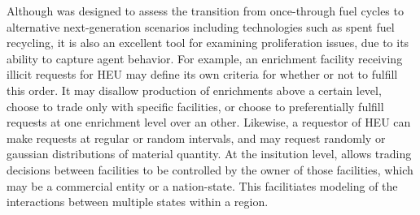 Although \Cyclus was designed to assess the transition from once-through fuel cycles to alternative next-generation scenarios including technologies such as spent fuel recycling, it is also an excellent tool for examining proliferation issues, due to its ability to capture agent behavior. For example, an enrichment facility receiving illicit requests for \gls{HEU} may define its own criteria for whether or not to fulfill this order.  It may disallow production of enrichments above a certain level, choose to trade only with specific facilities, or choose to preferentially fulfill requests at one enrichment level over an other.  Likewise, a requestor of \gls{HEU} can make requests at regular or random intervals, and may request randomly or gaussian distributions of material quantity.  At the insitution level, \Cyclus allows trading decisions between facilities to be controlled by the owner of those facilities, which may be a commercial entity or a nation-state.  This facilitiates modeling of the interactions between multiple states within a region.  





